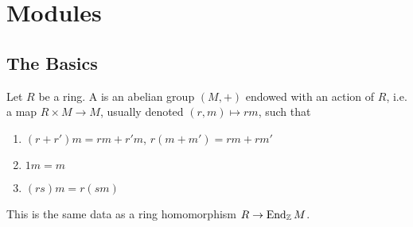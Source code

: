 \chapter{Modules}

\section{The Basics}

  \begin{define}
    Let $R$ be a ring. A  is an abelian group
    $(M,+)$ endowed with an action of $R$, i.e. a map $R\times M \to M$,
    usually denoted $(r,m)\mapsto rm$, such that
    \begin{enumerate}
      \item $(r + r')m = rm+r'm$, $r(m+m') = rm+rm'$
      \item $1m = m$
      \item $(rs)m = r(sm)$
    \end{enumerate}
  \end{define}
  This is the same data as a ring homomorphism $R \to \operatorname{End}_{\mathbb{Z}} M$.
